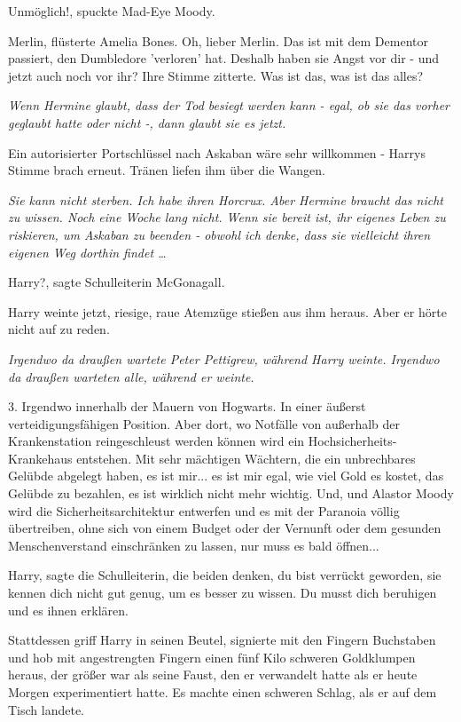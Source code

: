\glqq{}Unmöglich!\grqq{}, spuckte Mad-Eye Moody.

\glqq{}Merlin\grqq{}, flüsterte Amelia Bones. \glqq{}Oh, lieber Merlin. Das ist
mit dem Dementor passiert, den Dumbledore 'verloren' hat. Deshalb haben sie
Angst vor dir - und jetzt auch noch vor ihr?\grqq{} Ihre Stimme zitterte. \glqq{}Was
ist das, was ist das alles?\grqq{}

\emph{Wenn Hermine glaubt, dass der Tod besiegt werden kann - egal, ob sie das
vorher geglaubt hatte oder nicht -, dann glaubt sie es jetzt.}

\glqq{}Ein autorisierter Portschlüssel nach Askaban wäre sehr willkommen -\grqq{}
Harrys Stimme brach erneut. Tränen liefen ihm über die Wangen.

\emph{Sie kann nicht sterben. Ich habe ihren Horcrux. Aber Hermine braucht das
nicht zu wissen. Noch eine Woche lang nicht. Wenn sie bereit ist, ihr eigenes
Leben zu riskieren, um Askaban zu beenden - obwohl ich denke, dass sie
vielleicht ihren eigenen Weg dorthin findet …}

Harry?\grqq{}, sagte Schulleiterin McGonagall.

Harry weinte jetzt, riesige, raue Atemzüge stießen aus ihm heraus. Aber er hörte
nicht auf zu reden.

\emph{Irgendwo da draußen wartete Peter Pettigrew, während Harry weinte.
Irgendwo da draußen warteten alle, während er weinte.}

\glqq{}3. Irgendwo innerhalb der Mauern von Hogwarts. In einer äußerst
verteidigungsfähigen Position. Aber dort, wo Notfälle von außerhalb der
Krankenstation reingeschleust werden können wird ein Hochsicherheits-Krankehaus
entstehen. Mit sehr mächtigen Wächtern, die ein unbrechbares Gelübde abgelegt
haben, es ist mir... es ist mir egal, wie viel Gold es kostet, das Gelübde zu
bezahlen, es ist wirklich nicht mehr wichtig. Und, und Alastor Moody wird die
Sicherheitsarchitektur entwerfen und es mit der Paranoia völlig übertreiben,
ohne sich von einem Budget oder der Vernunft oder dem gesunden Menschenverstand
einschränken zu lassen, nur muss es bald öffnen...\grqq{}

\glqq{}Harry\grqq{}, sagte die Schulleiterin, \glqq{}die beiden denken, du bist
verrückt geworden, sie kennen dich nicht gut genug, um es besser zu wissen. Du
musst dich beruhigen und es ihnen erklären.\grqq{}

Stattdessen griff Harry in seinen Beutel, signierte mit den Fingern Buchstaben
und hob mit angestrengten Fingern einen fünf Kilo schweren Goldklumpen heraus,
der größer war als seine Faust, den er verwandelt hatte als er heute Morgen
experimentiert hatte. Es machte einen schweren Schlag, als er auf dem Tisch
landete.

